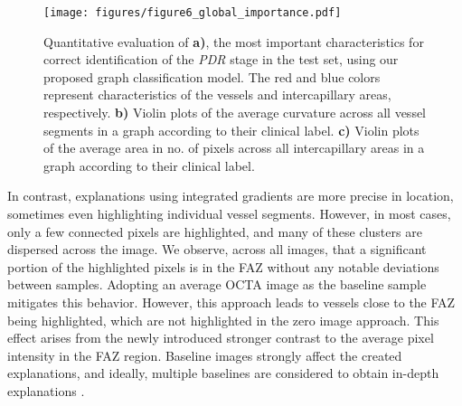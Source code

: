 \begin{figure}[!ht]
   \centering
    \texttt{[image: figures/figure6\_global\_importance.pdf]}
    \caption{Quantitative evaluation of \textbf{a)}, the most important characteristics for correct identification of the \textit{PDR} stage in the test set, using our proposed graph classification model. The red and blue colors represent characteristics of the \textcolor{ves_spatial}{vessels} and \textcolor{ica_spatial}{intercapillary areas}, respectively. \textbf{b)} Violin plots of the average curvature across all vessel segments in a graph according to their clinical label. \textbf{c)} Violin plots of the average area in no. of pixels across all intercapillary areas in a graph according to their clinical label.}
    \vspace{-0.3cm}
    \label{fig:global_importance}
\end{figure}


In contrast, explanations using integrated gradients are more precise in location, sometimes even highlighting individual vessel segments. However, in most cases, only a few connected pixels are highlighted, and many of these clusters are dispersed across the image. We observe, across all images, that a significant portion of the highlighted pixels is in the FAZ without any notable deviations between samples. Adopting an average OCTA image as the baseline sample mitigates this behavior. However, this approach leads to vessels close to the FAZ being highlighted, which are not highlighted in the zero image approach. This effect arises from the newly introduced stronger contrast to the average pixel intensity in the FAZ region. Baseline images strongly affect the created explanations, and ideally, multiple baselines are considered to obtain in-depth explanations \cite{sturmfels2020visualizing}.  



